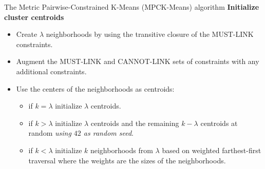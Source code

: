 \documentclass{beamer}
\newlength{\tmpShadow}
\newcommand{\MyShadow}[2]{%
	\settowidth{\tmpShadow}{#1}
	\addtolength{\tmpShadow}{.1em}
	\raisebox{-0.25ex}{\textcolor{gray!70}{#1}}%
	\kern-\tmpShadow%
	\textcolor{#2}{#1}%
}
\begin{document}
{\begin{frame}{The Metric Pairwise-Constrained K-Means (MPCK-Means) algorithm}\label{MPCKM}
	\textbf{Initialize cluster centroids}
	\vspace{4mm}
	\begin{itemize}[label={\MyShadow{$\bullet$}{blue!80}}]
		\item Create $\lambda$ neighborhoods by using the transitive closure of the MUST-LINK constraints. %
		\vspace{3mm}
		\item Augment the MUST-LINK and CANNOT-LINK sets of constraints with any additional constraints. %
		\vspace{3mm}
		\item Use the centers of the neighborhoods as centroids:
		\begin{itemize}[label={\MyShadow{$\circ$}{blue!80}}]
			\item if $k = \lambda$ initialize $\lambda$ centroids.
			\vspace{3mm}
			\item if $k > \lambda$ initialize $\lambda$ centroids and the remaining $k - \lambda$ centroids at random \textit{using \textbf{$42$} as random seed}.	
			\vspace{3mm}	
			\item if $k < \lambda$ initialize $k$ neighborhoods from $\lambda$ based on weighted farthest-first traversal where the weights are the sizes of the neighborhoods. 
		\end{itemize}		
	\vspace{6mm}			
	\end{itemize}	
	\vspace{6mm}	
\end{frame}	

}
\end{document}
